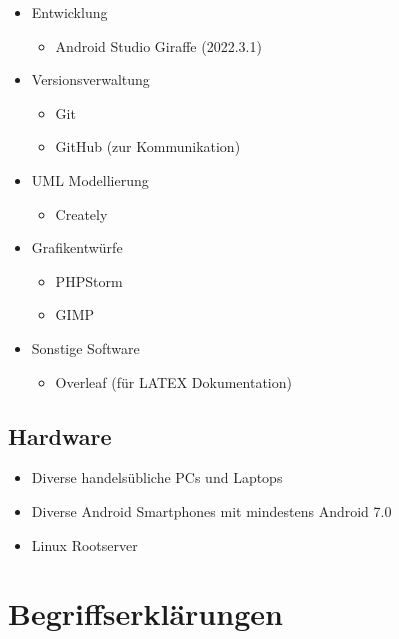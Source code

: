 \documentclass[oneside, ngerman]{sdqtechreport}
\begin{document}
\begin{itemize}
    \item Entwicklung
    \begin{itemize}
        \item Android Studio Giraffe (2022.3.1)
    \end{itemize}
    
    \item Versionsverwaltung
    \begin{itemize}
        \item Git
        \item GitHub (zur Kommunikation)
    \end{itemize}

    \item UML Modellierung
    \begin{itemize}
        \item Creately
    \end{itemize}

    \item Grafikentwürfe
    \begin{itemize}
        \item PHPStorm
        \item GIMP
    \end{itemize}

    \item Sonstige Software
    \begin{itemize}
        \item Overleaf (für LATEX Dokumentation)
    \end{itemize}
    
\end{itemize}

\section{Hardware}
\label{sec:Entwicklungsumgebung:Hardware}

\begin{itemize}
    \item Diverse handelsübliche PCs und Laptops
    \item Diverse Android Smartphones mit mindestens Android 7.0
    \item Linux Rootserver
\end{itemize}


\chapter{Begriffserklärungen}
\label{chap:Begriffserklärungen}
\end{document}
